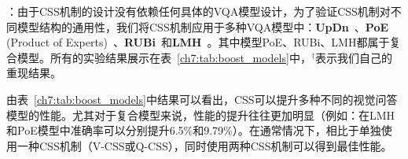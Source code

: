\textbf{}：由于CSS机制的设计没有依赖任何具体的VQA模型设计，为了验证CSS机制对不同模型结构的通用性，我们将CSS机制应用于多种VQA模型中：\textbf{UpDn}~\cite{anderson2018bottom}、\textbf{PoE} (Product of Experts)~\cite{clark2019don,mahabadi2019simple}、\textbf{RUBi}~\cite{cadene2019rubi}和\textbf{LMH}~\cite{clark2019don}。其中模型PoE、RUBi、LMH都属于复合模型。所有的实验结果展示在表~\ref{ch7:tab:boost_models}中，$^\dagger$表示我们自己的重现结果。

由表~\ref{ch7:tab:boost_models}中结果可以看出，CSS可以提升多种不同的视觉问答模型的性能。尤其对于复合模型来说，性能的提升往往更加明显（例如：在LMH和PoE模型中准确率可以分别提升6.5\%和9.79\%）。在通常情况下，相比于单独使用一种CSS机制（V-CSS或Q-CSS），同时使用两种CSS机制可以得到最佳性能。

